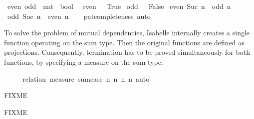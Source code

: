 \begin{isabellebody}
\isamarkuptrue%
\isamarkupfalse%
\ even\ odd\ {\isacharcolon}{\isacharcolon}\ {\isachardoublequoteopen}nat\ {\isasymRightarrow}\ bool{\isachardoublequoteclose}\isanewline
{}\isanewline
\ \ {\isachardoublequoteopen}even\ {}\ {\isacharequal}\ True{\isachardoublequoteclose}\isanewline
{\isacharbar}\ {\isachardoublequoteopen}odd\ {}\ {\isacharequal}\ False{\isachardoublequoteclose}\isanewline
{\isacharbar}\ {\isachardoublequoteopen}even\ {\isacharparenleft}Suc\ n{\isacharparenright}\ {\isacharequal}\ odd\ n{\isachardoublequoteclose}\isanewline
{\isacharbar}\ {\isachardoublequoteopen}odd\ {\isacharparenleft}Suc\ n{\isacharparenright}\ {\isacharequal}\ even\ n{\isachardoublequoteclose}\isanewline
%
\isadelimproof
\ \ %
\endisadelimproof
%
\isatagproof
{}\isamarkupfalse%
\ pat{\isacharunderscore}completeness\ auto%
\endisatagproof
{\isafoldproof}%
%
\isadelimproof
%
\endisadelimproof
%
\begin{isamarkuptext}%
To solve the problem of mutual dependencies, Isabelle internally
  creates a single function operating on the sum
  type. Then the original functions are defined as
  projections. Consequently, termination has to be proved
  simultaneously for both functions, by specifying a measure on the
  sum type:%
\end{isamarkuptext}%
\isamarkuptrue%
\isamarkupfalse%
\ \isanewline
%
\isadelimproof
\ \ %
\endisadelimproof
%
\isatagproof
{}\isamarkupfalse%
\ {\isacharparenleft}relation\ {\isachardoublequoteopen}measure\ {\isacharparenleft}sum{\isacharunderscore}case\ {\isacharparenleft}{\isacharpercent}n{\isachardot}\ n{\isacharparenright}\ {\isacharparenleft}{\isacharpercent}n{\isachardot}\ n{\isacharparenright}{\isacharparenright}{\isachardoublequoteclose}{\isacharparenright}\ auto%
\endisatagproof
{\isafoldproof}%
%
\isadelimproof
%
\endisadelimproof
%
\isamarkuptrue%
%
\begin{isamarkuptext}%
FIXME%
\end{isamarkuptext}%
\isamarkuptrue%
%
\isamarkuptrue%
%
\begin{isamarkuptext}%
FIXME%
\end{isamarkuptext}%
\isamarkuptrue%
%
\isadelimtheory
%
\endisadelimtheory
%
\isatagtheory
{}\isamarkupfalse%
%
\endisatagtheory
{\isafoldtheory}%
%
\isadelimtheory
%
\endisadelimtheory
\isanewline
\end{isabellebody}%

